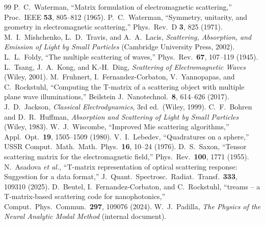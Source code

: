 \documentclass[11pt]{article}
\begin{document}
\begin{thebibliography}{99}
 P.~C.~Waterman, ``Matrix formulation of
electromagnetic scattering,'' Proc.\ IEEE \textbf{53}, 805--812 (1965).
 P.~C.~Waterman, ``Symmetry, unitarity, and
geometry in electromagnetic scattering,'' Phys.\ Rev.\ D \textbf{3},
825 (1971).
 M.~I.~Mishchenko, L.~D.~Travis, and
A.~A.~Lacis, \emph{Scattering, Absorption, and Emission of Light by
Small Particles} (Cambridge University Press, 2002).
 L.~L.~Foldy, ``The multiple scattering of waves,''
Phys.\ Rev.\ \textbf{67}, 107--119 (1945).
 L.~Tsang, J.~A.~Kong, and K.-H.~Ding,
\emph{Scattering of Electromagnetic Waves} (Wiley, 2001).
 M.~Fruhnert, I.~Fernandez-Corbaton,
V.~Yannopapas, and C.~Rockstuhl, ``Computing the T-matrix of a
scattering object with multiple plane wave illuminations,'' Beilstein
J.\ Nanotechnol.\ \textbf{8}, 614--626 (2017).
 J.~D.~Jackson, \emph{Classical Electrodynamics},
3rd ed.\ (Wiley, 1999).
 C.~F.~Bohren and D.~R.~Huffman, \emph{Absorption
and Scattering of Light by Small Particles} (Wiley, 1983).
 W.~J.~Wiscombe, ``Improved Mie scattering
algorithms,'' Appl.\ Opt.\ \textbf{19}, 1505--1509 (1980).
 V.~I.~Lebedev, ``Quadratures on a sphere,''
USSR Comput.\ Math.\ Math.\ Phys.\ \textbf{16}, 10--24 (1976).
 D.~S.~Saxon, ``Tensor scattering matrix for the
electromagnetic field,'' Phys.\ Rev.\ \textbf{100}, 1771 (1955).
 N.~Asadova \emph{et al.}, ``T-matrix
representation of optical scattering response: Suggestion for a data
format,'' J.\ Quant.\ Spectrosc.\ Radiat.\ Transf.\ \textbf{333},
109310 (2025).
 D.~Beutel, I.~Fernandez-Corbaton, and
C.~Rockstuhl, ``treams -- a T-matrix-based scattering code for
nanophotonics,'' Comput.\ Phys.\ Commun.\ \textbf{297}, 109076 (2024).
 W.~J.~Padilla, \emph{The Physics of the Neural Analytic
Modal Method} (internal document).
\end{thebibliography}
\end{document}
